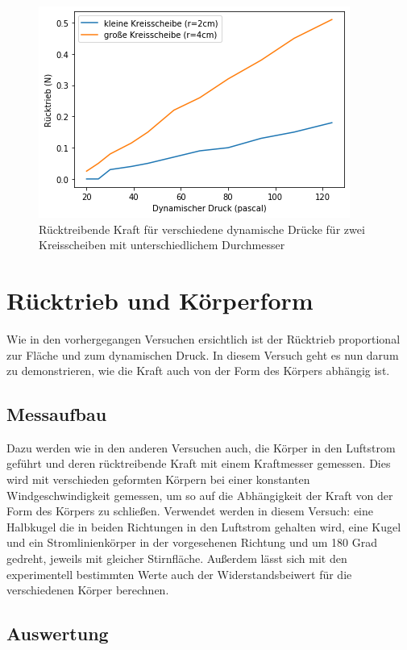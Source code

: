 \begin{figure}[h!]
    \centering
    \includegraphics[scale= 0.8]{Aeromechanik/Protokoll/fig/Aeromechanik Versuch 2.22.png}
    \caption{Rücktreibende Kraft für verschiedene dynamische Drücke für zwei Kreisscheiben mit unterschiedlichem Durchmesser}
    \label{fig:Aeromechanik Versuch 2.22}
\end{figure}

\section{Rücktrieb und Körperform}

Wie in den vorhergegangen Versuchen ersichtlich ist der Rücktrieb proportional zur Fläche und zum dynamischen Druck. In diesem Versuch geht es nun darum zu demonstrieren, wie die Kraft auch von der Form des Körpers abhängig ist. 

\subsection{Messaufbau}

Dazu werden wie in den anderen Versuchen auch, die Körper in den Luftstrom geführt und deren rücktreibende Kraft mit einem Kraftmesser gemessen. Dies wird mit verschieden geformten Körpern bei einer konstanten Windgeschwindigkeit gemessen, um so auf die Abhängigkeit der Kraft von der Form des Körpers zu schließen. Verwendet werden in diesem Versuch: eine Halbkugel die in beiden Richtungen in den Luftstrom gehalten wird, eine Kugel und ein Stromlinienkörper in der vorgesehenen Richtung und um 180 Grad gedreht, jeweils mit gleicher Stirnfläche. Außerdem lässt sich mit den experimentell bestimmten Werte auch der Widerstandsbeiwert für die verschiedenen Körper berechnen.

\subsection{Auswertung}

